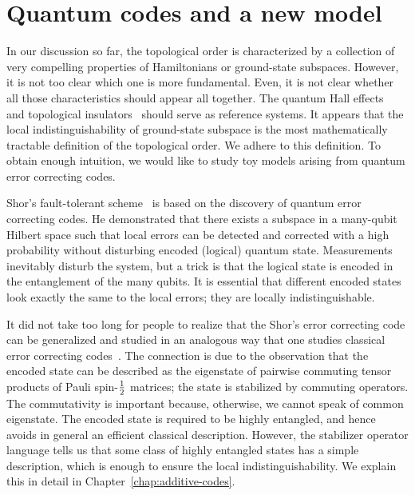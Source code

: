\section{Quantum codes and a new model}

In our discussion so far, the topological order is characterized by a collection of very compelling properties of Hamiltonians or ground-state subspaces. However, it is not too clear which one is more fundamental. Even, it is not clear whether all those characteristics should appear all together. The quantum Hall effects~\cite{PrangeGirvin1990HallEffect} and topological insulators~\cite{HasanKane2010TIReview} should serve as reference systems. It appears that the local indistinguishability of ground-state subspace is the most mathematically tractable definition of the topological order. We adhere to this definition. To obtain enough intuition, we would like to study toy models arising from quantum error correcting codes.

Shor's fault-tolerant scheme~\cite{Shor1996Fault-tolerant} is based on the discovery of quantum error correcting codes. He demonstrated that there exists a subspace in a many-qubit Hilbert space such that local errors can be detected and corrected with a high probability without disturbing encoded (logical) quantum state. Measurements inevitably disturb the system, but a trick is that the logical state is encoded in the entanglement of the many qubits. It is essential that different encoded states look exactly the same to the local errors; they are locally indistinguishable.

It did not take too long for people to realize that the Shor's error correcting code can be generalized and studied in an analogous way that one studies classical error correcting codes~\cite{CalderbankShor1996Good, Steane1996Multiple, Gottesman1996Saturating, CalderbankRainsShorEtAl1997Quantum}. The connection is due to the observation that the encoded state can be described as the eigenstate of pairwise commuting tensor products of Pauli spin-$\frac{1}{2}$ matrices; the state is stabilized by commuting operators. The commutativity is important because, otherwise, we cannot speak of common eigenstate. The encoded state is required to be highly entangled, and hence avoids in general an efficient classical description. However, the stabilizer operator language tells us that some class of highly entangled states has a simple description, which is enough to ensure the local indistinguishability. We explain this in detail in Chapter~\ref{chap:additive-codes}.

